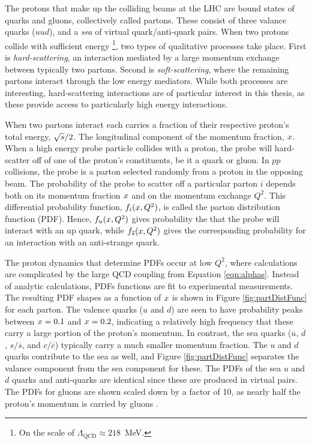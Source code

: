 The protons that make up the colliding beams at the LHC are bound states of quarks and gluons, collectively called partons.
These consist of three valance quarks ($uud$), and a \emph{sea} of virtual quark/anti-quark pairs.
When two protons collide with sufficient energy \footnote{On the scale of $\Lambda_\text{QCD}\approx218$~MeV.}, two types of qualitative processes take place.
First is \emph{hard-scattering}, an interaction mediated by a large momentum exchange between typically two partons.
Second is \emph{soft-scattering}, where the remaining partons interact through the low energy mediators.
While both processes are interesting, hard-scattering interactions are of particular interest in this thesis, as these provide access to particularly high energy interactions.

When two partons interact each carries a fraction of their respective proton's total energy, $\sqrt{s}/2$.
The longitudinal component of the momentum fraction, $x$.
When a high energy probe particle collides with a proton, the probe will hard-scatter off of one of the proton's constituents, be it a quark or gluon.
In $pp$ collisions, the probe is a parton selected randomly from a proton in the opposing beam.
The probability of the probe to scatter off a particular parton $i$ depends both on its momentum fraction $x$ and on the momentum exchange $Q^2$.
This differential probability function, $f_i(x,Q^2)$, is called the parton distribution function (PDF).
Hence, $f_u(x,Q^2)$ gives probability the that the probe will interact with an up quark, while $f_{\overline{s}}(x,Q^2)$ gives the corresponding probability for an interaction with an anti-strange quark.

The proton dynamics that determine PDFs occur at low $Q^2$, where calculations are complicated by the large QCD coupling from Equation \ref{eqn:alphas}.
Instead of analytic calculations, PDFs functions are fit to experimental measurements.
The resulting PDF shapes as a function of $x$ is shown in Figure \ref{fig:partDistFunc} for each parton.
The valence quarks ($u$ and $d$) are seen to have probability peaks between $x=0.1$ and $x=0.2$, indicating a relatively high frequency that these carry a large portion of the proton's momentum.
In contrast, the sea quarks ($\overline{u}$, $\overline{d}$, $s/\overline{s}$, and $c/\overline{c}$) typically carry a much smaller momentum fraction.
The $u$ and $d$ quarks contribute to the sea as well, and Figure \ref{fig:partDistFunc} separates the valance component from the sea component for these.
The PDFs of the sea $u$ and $d$ quarks and anti-quarks are identical since these are produced in virtual pairs.
The PDFs for gluons are shown scaled down by a factor of 10, as nearly half the proton's momentum is carried by gluons \cite{wells}.

